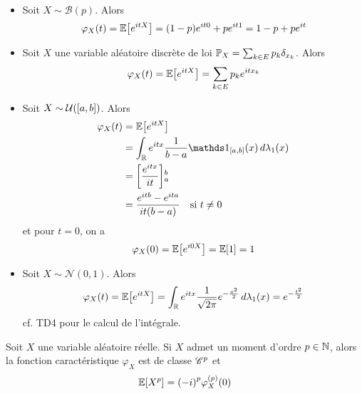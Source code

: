 \begin{example}\,
    \begin{itemize}
        \item Soit \(X\sim\mathcal B(p)\). Alors
        \begin{equation*}
            \varphi_X(t) = \mathbb{E}\mathopen{}\left[e^{itX}\right]\mathclose{} = (1-p)e^{it0} + pe^{it1} = 1-p+pe^{it}
        \end{equation*}

        \item Soit \(X\) une variable aléatoire discrète de loi \(\mathbb{P}_X = \sum_{k\in E}p_k\delta_{x_k}\).
        Alors
        \begin{equation*}
            \varphi_X(t) = \mathbb{E}\mathopen{}\left[e^{itX}\right]\mathclose{} = \sum_{k\in E}p_k e^{itx_k}
        \end{equation*}

        \item Soit \(X\sim\mathcal U(\mathopen{}\left[a,b\right]\mathclose{})\). Alors
        \begin{equation*}
            \begin{aligned}
                \varphi_X(t) 
                &= \bb E\ff{e^{itX}}\\
                &= \int_{\bb R} e^{itx}\frac{1}{b-a}\one_{\ff{a,b}}(x)\der\lambda_1(x)\\
                &= \ff{\frac{e^{itx}}{it}}_a^b\\
                &= \frac{e^{itb}-e^{ita}}{it(b-a)}\quad \text{si } t\neq 0
            \end{aligned}
        \end{equation*}
        et pour \(t=0\), on a 
        \begin{equation*}
            \varphi_X(0) = \mathbb{E}\mathopen{}\left[e^{i0X}\right]\mathclose{} = \mathbb{E}\mathopen{}\left[1\right]\mathclose{} = 1
        \end{equation*}

        \item Soit \(X\sim\mathcal N(0,1)\). Alors
        \begin{equation*}
            \varphi_X(t) = \mathbb{E}\mathopen{}\left[e^{itX}\right]\mathclose{} = \int_{\mathbb{R}} e^{itx}\frac{1}{\sqrt{2\pi}}e^{-\frac{x^2}{2}}\mathop{}\!{d}\lambda_1(x) = e^{-\frac{t^2}{2}}
        \end{equation*}
        cf. TD4 pour le calcul de l'intégrale.
    \end{itemize}
\end{example}

\begin{proposition}
    Soit \(X\) une variable aléatoire réelle. Si \(X\) admet un moment d'ordre \(p\in\mathbb{N}\),
    alors la fonction caractéristique \(\varphi_X\) est de classe \(\mathscr{C}^p\) et
    \begin{equation*}
        \mathbb{E}\mathopen{}\left[X^p\right]\mathclose{} = {\left(-i\right)}^p \varphi_X^{(p)}(0)
    \end{equation*}
\end{proposition}

